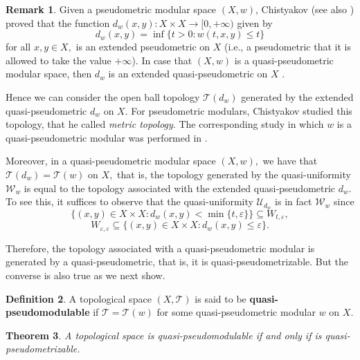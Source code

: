 \documentclass[11pt,a4paper]{amsart}
\newtheorem{theorem}{Theorem}[section]
\theoremstyle{definition}
\newtheorem{definition}[theorem]{Definition}
\newtheorem{remark}[theorem]{Remark}
\begin{document}
	
	\begin{remark}
		Given a pseudometric modular space $(X,w)$, Chistyakov \cite[Theorem 2.2.1]{Chis15} (see also \cite[Theorem 2.6]{Chis10a}) proved that the function $d_w(x,y):X\times X\to [0,+\infty)$ given by
		$$d_w(x,y)=\inf\{t>0:w(t,x,y)\leq t\}$$
		for all $x,y\in X,$ is an extended pseudometric on $X$ (i.e., a pseudometric that it is allowed to take the value $+\infty$). In case that $(X,w)$ is a quasi-pseudometric modular space, then $d_w$ is an extended quasi-pseudometric on $X$ \cite[Theorem 3.1.2]{SebogodiPhD}.
		
		Hence we can consider the open ball topology $\mathcal{T}(d_w)$ generated by the extended quasi-pseudometric $d_w$ on $X.$ For pseudometric modulars, Chistyakov \cite[Section 4.1.2]{Chis15} studied this topology, that he called \emph{metric topology}.
		The corresponding study in which $w$ is a quasi-pseudometric modular was performed in \cite{SebogodiPhD}.
		
		Moreover, in a quasi-pseudometric modular space $(X,w),$ we have that $\mathcal{T}(d_w)=\mathcal{T}(w)$ on $X,$ that is, the topology generated by the quasi-uniformity $\mathcal{W}_w$ is equal to the topology associated with the extended quasi-pseudometric $d_w.$ To see this, it suffices to observe that the quasi-uniformity $\mathcal{U}_{d_w}$ is in fact $\mathcal{W}_w$ since
		$$\{(x,y)\in X\times X:d_w(x,y)<\min\{t,\varepsilon\}\}\subseteq W_{t,\varepsilon},$$
		$$W_{\varepsilon,\varepsilon}\subseteq \{(x,y)\in X\times X:d_w(x,y)\leq \varepsilon\}.$$
	\end{remark}
	
	
	Therefore, the topology associated with a quasi-pseudometric modular is generated by a quasi-pseudometric, that is, it is quasi-pseudometrizable. But the converse is also true as we next show.
	
	
	\begin{definition}
		A topological space $(X,\mathcal{T})$ is said to be \textbf{quasi-pseudomodulable} if $\mathcal{T}=\mathcal{T}(w)$ for some quasi-pseudometric modular $w$ on $X$.
	\end{definition}
	
	
	
	
	\begin{theorem}\label{thm:qpm}
		A topological space is quasi-pseudomodulable if and only if is quasi-pseudo\-metrizable.
	\end{theorem}
	
\end{document}
